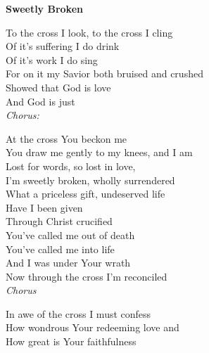 \textbf{Sweetly Broken}

To the cross I look, to the cross I cling \\
Of it's suffering I do drink \\
Of it's work I do sing \\

For on it my Savior both bruised and crushed \\
Showed that God is love \\
And God is just \\

\textit{Chorus:}

At the cross You beckon me \\
You draw me gently to my knees, and I am \\
Lost for words, so lost in love, \\
I’m sweetly broken, wholly surrendered \\

What a priceless gift, undeserved life \\
Have I been given \\
Through Christ crucified \\

You’ve called me out of death \\
You’ve called me into life \\
And I was under Your wrath \\
Now through the cross I’m reconciled \\

\textit{Chorus}

In awe of the cross I must confess \\
How wondrous Your redeeming love and \\
How great is Your faithfulness \\
